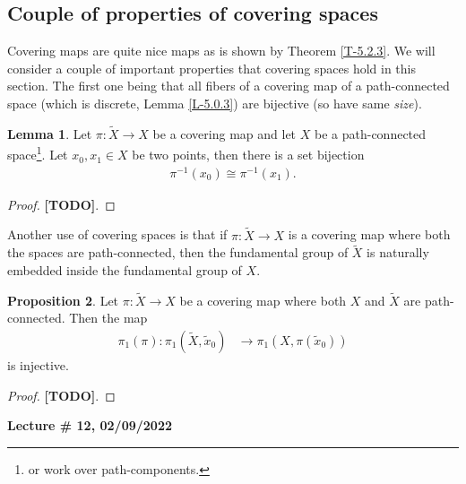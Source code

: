 \documentclass[letterpaper,11pt,twoside]{article}
\theoremstyle{definition}
\newtheorem{proposition}{Proposition}[subsection]
\theoremstyle{definition}
\theoremstyle{definition}
\theoremstyle{definition}
\newtheorem{lemma}[proposition]{\textbf{Lemma}}
\theoremstyle{definition}
\theoremstyle{definition}
\theoremstyle{remark}
\theoremstyle{definition}
\newcommand{\isom}{\cong}
\newcommand{\newlecture}[2]{\begin{center}
    \textbf{Lecture \# #1, #2}
\end{center}}
\begin{document}
\subsection{Couple of properties of covering spaces}
Covering maps are quite nice maps as is shown by Theorem \ref{T-5.2.3}. We will consider a couple of important properties that covering spaces hold in this section. The first one being that all fibers of a covering map of a path-connected space (which is discrete, Lemma \ref{L-5.0.3}) are bijective (so have same \textit{size}).
\begin{lemma}
Let $\pi : \tilde{X} \to X$ be a covering map and let $X$ be a path-connected space\footnote{or work over path-components.}. Let $x_0,x_1\in X$ be two points, then there is a set bijection
\begin{align*}
    \pi^{-1} (x_0) \isom     \pi^{-1}(x_1).
\end{align*}
\begin{proof}
\textbf{[TODO]}.
\end{proof}
\end{lemma}
Another use of covering spaces is that if $\pi : \tilde{X} \to X$ is a covering map where both the spaces are path-connected, then the fundamental group of $\tilde{X}$ is naturally embedded inside the fundamental group of $X$.
\begin{proposition}
Let $\pi : \tilde{X} \to X$ be a covering map where both $X$ and $\tilde{X} $ are path-connected. Then the map 
\begin{align*}
    \pi_1(\pi) : \pi_1(\tilde{X},\tilde{x}_0) &\longrightarrow \pi_1(X,\pi(\tilde{x}_0))
\end{align*}
is injective.
\end{proposition}
\begin{proof}
    \textbf{[TODO]}.
\end{proof}
\newlecture{12}{02/09/2022}
\end{document}
